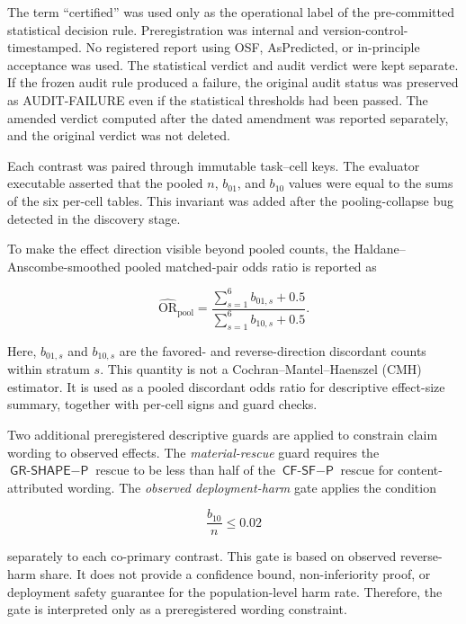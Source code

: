 \documentclass{article}
\numberwithin{equation}{section}  %
\theoremstyle{definition}
\newcommand{\bten}{b_{10}}
\newcommand{\bzo}{b_{01}}
\newcommand{\armP}{\textsf{P}}
\newcommand{\armCF}{\textsf{CF-SF}}
\newcommand{\armGR}{\textsf{GR-SHAPE}}
\begin{document}
The term ``certified'' was used only as the operational label of the pre-committed statistical
decision rule. Preregistration was internal and version-control-timestamped. No registered
report using OSF, AsPredicted, or in-principle acceptance was used. The statistical verdict and
audit verdict were kept separate. If the frozen audit rule produced a failure, the original
audit status was preserved as AUDIT-FAILURE even if the statistical thresholds had been passed.
The amended verdict computed after the dated amendment was reported separately, and the
original verdict was not deleted.

Each contrast was paired through immutable task--cell keys. The evaluator executable asserted
that the pooled $n$, $\bzo$, and $\bten$ values were equal to the sums of the six per-cell
tables. This invariant was added after the pooling-collapse bug detected in the discovery
stage.

To make the effect direction visible beyond pooled counts, the Haldane--Anscombe-smoothed
pooled matched-pair odds ratio is reported as

\begin{equation}\label{eq:orpool}
\widehat{\mathrm{OR}}_{\mathrm{pool}}=
\frac{\sum_{s=1}^{6} b_{01,s}+0.5}
     {\sum_{s=1}^{6} b_{10,s}+0.5}.
\end{equation}

Here, $b_{01,s}$ and $b_{10,s}$ are the favored- and reverse-direction discordant counts
within stratum $s$. This quantity is not a Cochran--Mantel--Haenszel (CMH) estimator. It is
used as a pooled discordant odds ratio for descriptive effect-size summary, together with
per-cell signs and guard checks.

Two additional preregistered descriptive guards are applied to constrain claim wording to
observed effects. The \emph{material-rescue} guard requires the $\armGR-\armP$ rescue to be
less than half of the $\armCF-\armP$ rescue for content-attributed wording. The
\emph{observed deployment-harm} gate applies the condition

\begin{equation}\label{eq:harm}
\frac{\bten}{n}\le 0.02
\end{equation}

separately to each co-primary contrast. This gate is based on observed reverse-harm share. It
does not provide a confidence bound, non-inferiority proof, or deployment safety guarantee for
the population-level harm rate. Therefore, the gate is interpreted only as a preregistered
wording constraint.
\end{document}
